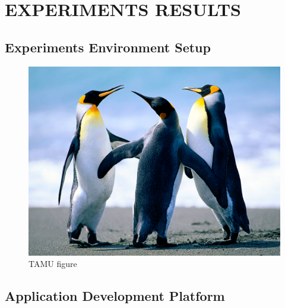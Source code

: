 %
%
%


\chapter{\uppercase{Experiments Results}}



\section{Experiments Environment Setup}

\begin{figure}[H]
\centering
\includegraphics[scale=.50]{figures/Penguins.jpg}
\caption{TAMU figure}
\label{fig:tamu-fig3}
\end{figure}
\section{Application Development Platform}

